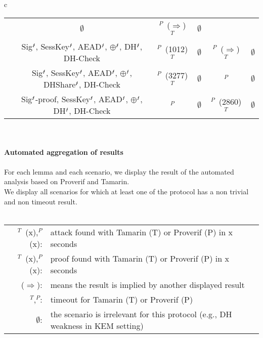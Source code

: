 \documentclass[letterpaper, 10pt, table]{standalone}
\newcommand{\attack}{\textcolor{FireBrick}{\ding{55}}}
\newcommand{\ok}{\textcolor{Green}{\ding{51}}}
\newcommand{\attp}[1]{\attack$^P$~(#1)}
\newcommand{\attt}[1]{\attack$^T$~(#1)}
\newcommand{\implied}{$\Rightarrow$}
\newcommand{\okp}[1]{\ok$^P$~(#1)}
\newcommand{\okt}[1]{\ok$^T$~(#1)}
\newcommand{\timeoutp}{\faClock[regular]$^P$}
\newcommand{\timeoutt}{\faClock[regular]$^T$}
\newcommand{\invalid}{$\emptyset$}
\newcommand{\weak}[1]{#1\ensuremath{^{\text{\Lightning}}}}
\newcommand{\PreciseSignature}{{\sf \weak{Sig}}}
\newcommand{\WeakAEAD}{{\sf \weak{AEAD}}}
\newcommand{\XorPrecise}{{\sf \weak{$\oplus$}}}
\newcommand{\PreciseSignatureProof}{{\sf \weak{Sig}-proof}}
\newcommand{\PreciseDH}{{\sf \weak{DH}}}
\newcommand{\LeakSessionKey}{{\sf \weak{SessKey}}}
\newcommand{\LeakShare}{{\sf \weak{DHShare}}}
\newcommand{\NeutralCheck}{{\sf DH-Check}}
\begin{document}
\begin{tabular}{c}
\begin{NiceTabular} {c c c c c c }
& \invalid  & \okp{\implied} \timeoutt & \invalid   \\  & \PreciseSignature, \LeakSessionKey, \WeakAEAD, \XorPrecise, \PreciseDH, \NeutralCheck & \okp{1012} \timeoutt & \invalid  & \okp{\implied} \timeoutt & \invalid   \\  & \PreciseSignature, \LeakSessionKey, \WeakAEAD, \XorPrecise, \LeakShare, \NeutralCheck & \okp{3277} \timeoutt & \invalid  & \timeoutp  & \invalid   \\  & \PreciseSignatureProof, \LeakSessionKey, \WeakAEAD, \XorPrecise, \PreciseDH, \NeutralCheck & \timeoutp  & \invalid  & \okp{2860} \timeoutt & \invalid   \\   \hline \end{NiceTabular} 
\\ 
\\
\textbf{Automated aggregation of results}
\\
\\
For each lemma and each scenario, we display the result of the automated analysis based on Proverif and Tamarin. \\
 We display all scenarios for which at least one of the protocol has a non trivial and non timeout result.
\\
\\
\begin{tabular}{rl}
\attt{x},\attp{x}:& attack found with Tamarin (T) or Proverif (P) in x seconds \\
\okt{x},\okp{x}:& proof found with Tamarin (T) or Proverif (P) in x seconds \\
 (\implied):& means the result is implied by another displayed result \\
\timeoutt,\timeoutp: & timeout for Tamarin (T) or Proverif (P) \\
\invalid: & the scenario is irrelevant for this protocol (e.g., DH weakness in KEM setting)

\end{tabular}

\end{tabular}

 
\end{document}

